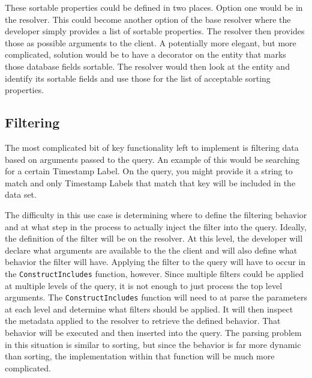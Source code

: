These sortable properties could be defined in two places.  Option one would be in the resolver.  This could become another option of the base resolver where the developer simply provides a list of sortable properties.  The resolver then provides those as possible arguments to the client.  A potentially more elegant, but more complicated, solution would be to have a decorator on the entity that marks those database fields sortable.  The resolver would then look at the entity and identify its sortable fields and use those for the list of acceptable sorting properties.

\subsection{Filtering}

The most complicated bit of key functionality left to implement is filtering data based on arguments passed to the query.  An example of this would be searching for a certain Timestamp Label.  On the query, you might provide it a string to match and only Timestamp Labels that match that key will be included in the data set.

The difficulty in this use case is determining where to define the filtering behavior and at what step in the process to actually inject the filter into the query.  Ideally, the definition of the filter will be on the resolver. At this level, the developer will declare what arguments are available to the the client and will also define what behavior the filter will have.  Applying the filter to the query will have to occur in the \verb!ConstructIncludes! function, however.  Since multiple filters could be applied at multiple levels of the query, it is not enough to just process the top level arguments.  The \verb!ConstructIncludes! function will need to at parse the parameters at each level and determine what filters should be applied.  It will then inspect the metadata applied to the resolver to retrieve the defined behavior.  That behavior will be executed and then inserted into the query.  The parsing problem in this situation is similar to sorting, but since the behavior is far more dynamic than sorting, the implementation within that function will be much more complicated.